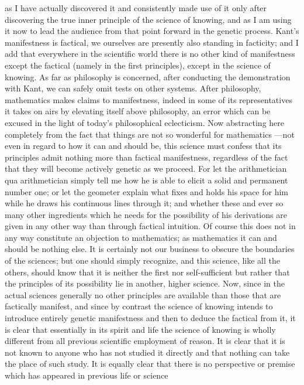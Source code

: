 as I have actually discovered it and consistently
made use of it only after discovering the true
inner principle of the science of knowing,
and as I am using it now to lead the audience
from that point forward in the genetic process.
Kant's manifestness is factical,
we ourselves are presently also standing in facticity;
and I add that everywhere in the scientific world
there is no other kind of manifestness except the factical
(namely in the first principles),
except in the science of knowing.
As far as philosophy is concerned,
after conducting the demonstration with Kant,
we can safely omit tests on other systems.
After philosophy, mathematics makes claims to manifestness,
indeed in some of its representatives it takes on airs
by elevating itself above philosophy,
an error which can be excused in the light of
today's philosophical eclecticism.
Now abstracting here completely from the fact
that things are not so wonderful for mathematics
—not even in regard to how it can and should be,
this science must confess that its principles admit
nothing more than factical manifestness,
regardless of the fact that they will become
actively genetic as we proceed.
For let the arithmetician qua arithmetician simply tell me
how he is able to elicit a solid and permanent number one;
or let the geometer explain what fixes and holds his space
for him while he draws his continuous lines through it;
and whether these and ever so many other ingredients
which he needs for the possibility of his derivations are
given in any other way than through factical intuition.
Of course this does not in any way constitute an
objection to mathematics;
as mathematics it can and should be nothing else.
It is certainly not our business to obscure the boundaries of the sciences;
but one should simply recognize, and this science, like all the others,
should know that it is neither the first nor self-sufficient
but rather that the principles of its possibility lie in another,
higher science.
Now, since in the actual sciences generally
no other principles are available than those
that are factically manifest, and since by contrast
the science of knowing intends to introduce
entirely genetic manifestness and then to
deduce the factical from it,
it is clear that essentially in its spirit and life
the science of knowing is wholly different from
all previous scientific employment of reason.
It is clear that it is not known to anyone who has not studied it directly
and that nothing can take the place of such study.
It is equally clear that there is no perspective or premise
which has appeared in previous life or science
